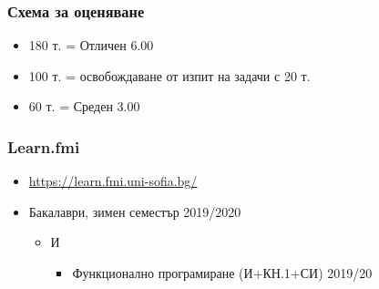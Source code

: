 \documentclass[alsotrans]{beamerswitch}
\begin{document}
\begin{frame}
  \frametitle{Схема за оценяване}

  \begin{itemize}
  \item 180 т. = Отличен 6.00
  \item 100 т. = освобождаване от изпит на задачи с 20 т.
  \item 60 т. = Среден 3.00
  \end{itemize}
\end{frame}

\begin{frame}
  \frametitle{Learn.fmi}
  
  \begin{itemize}
  \item \url{https://learn.fmi.uni-sofia.bg/}
  \item Бакалаври, зимен семестър 2019/2020
    \begin{itemize}
    \item И
      \begin{itemize}
      \item Функционално програмиране (И+КН.1+СИ) 2019/20
      \end{itemize}
    \end{itemize}
  \end{itemize}
\end{frame}
\end{document}
